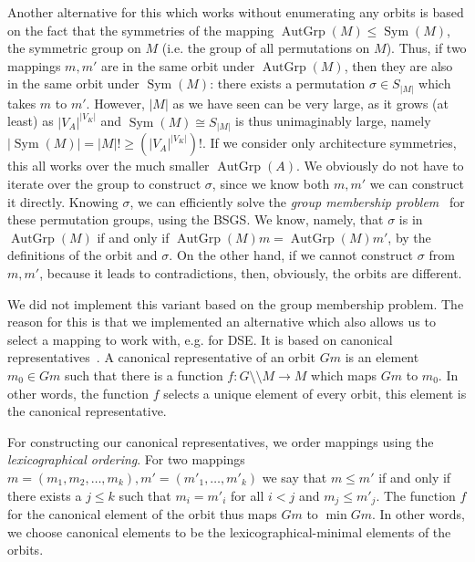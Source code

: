Another alternative for this which works without enumerating any orbits is based on the fact that the symmetries of the mapping $\operatorname{AutGrp}(M) \leq \operatorname{Sym}(M)$, the symmetric group on $M$ (i.e. the group of all permutations on $M$).
Thus, if two mappings $m, m'$ are in the same orbit under $\operatorname{AutGrp}(M)$, then they are also in the same orbit under $\operatorname{Sym}(M)$: there exists a permutation $\sigma \in S_{|M|}$ which takes $m$ to $m'$.
However, $|M|$ as we have seen can be very large, as it grows (at least) as $|V_A|^|V_K|$ and $\operatorname{Sym}(M) \cong S_{|M|}$ is thus unimaginably large, namely $|\operatorname{Sym}(M)| = |M|! \geq (|V_A|^|V_K|)!$.
If we consider only architecture symmetries, this all works over the much smaller $\operatorname{AutGrp}(A)$.  We obviously do not have to iterate over the group to construct $\sigma$, since we know both $m,m'$ we can construct it directly.
Knowing $\sigma$, we can efficiently solve the \emph{group membership problem}~\cite{seress2003permutation} for these permutation groups, using the \ac{BSGS}. 
We know, namely, that $\sigma$ is in $\operatorname{AutGrp}(M)$ if and only if $\operatorname{AutGrp}(M)m = \operatorname{AutGrp}(M)m'$, by the definitions of the orbit and $\sigma$.
On the other hand, if we cannot construct $\sigma$ from $m,m'$, because it leads to contradictions, then, obviously, the orbits are different.

We did not implement this variant based on the group membership problem.
The reason for this is that we implemented an alternative which also allows us to select a mapping to work with, e.g. for \ac{DSE}.
It is based on canonical representatives~\cite{goens_taco17,goens_mcsoc18}.
A canonical representative of an orbit $Gm$ is an element $m_0 \in Gm$ such that there is a function
$f : G \setminus \setminus M \rightarrow M$ which maps $Gm$ to $m_0$.
In other words, the function $f$ selects a unique element of every orbit, this element is the canonical representative.

For constructing our canonical representatives, we order mappings using the \emph{lexicographical ordering}.
For two mappings $m = (m_1,m_2,\ldots,m_k), m' = (m'_1,\ldots,m'_k)$ we say that $m \leq m'$ if and only if there exists a $j \leq k$ such that $m_i = m'_i$ for all $i < j$ and $m_j \leq m'_j$.
The function $f$ for the canonical element of the orbit thus maps $Gm$ to $\min Gm$.
In other words, we choose canonical elements to be the lexicographical-minimal elements of the orbits.


